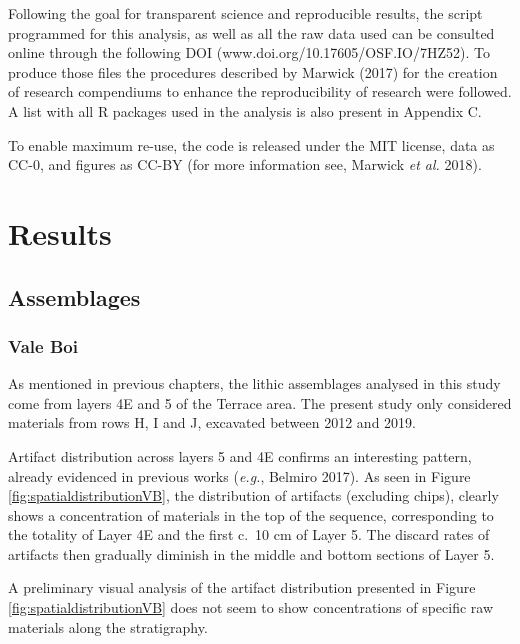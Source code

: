 \documentclass[12pt,twoside]{reedthesis}
\begin{document}
Following the goal for transparent science and reproducible results, the script programmed for this analysis, as well as all the raw data used can be consulted online through the following DOI (www.doi.org/10.17605/OSF.IO/7HZ52). To produce those files the procedures described by Marwick (2017) for the creation of research compendiums to enhance the reproducibility of research were followed. A list with all R packages used in the analysis is also present in Appendix C.

To enable maximum re-use, the code is released under the MIT license, data as CC-0, and figures as CC-BY (for more information see, Marwick \emph{et al.} 2018).

\hypertarget{results}{%
\chapter{Results}\label{results}}

\hypertarget{assemblages}{%
\section{Assemblages}\label{assemblages}}

\hypertarget{vale-boi-2}{%
\subsection{Vale Boi}\label{vale-boi-2}}

As mentioned in previous chapters, the lithic assemblages analysed in this study come from layers 4E and 5 of the Terrace area. The present study only considered materials from rows H, I and J, excavated between 2012 and 2019.

Artifact distribution across layers 5 and 4E confirms an interesting pattern, already evidenced in previous works (\emph{e.g.}, Belmiro 2017). As seen in Figure \ref{fig:spatialdistributionVB}, the distribution of artifacts (excluding chips), clearly shows a concentration of materials in the top of the sequence, corresponding to the totality of Layer 4E and the first c.~10 cm of Layer 5. The discard rates of artifacts then gradually diminish in the middle and bottom sections of Layer 5.

A preliminary visual analysis of the artifact distribution presented in Figure \ref{fig:spatialdistributionVB} does not seem to show concentrations of specific raw materials along the stratigraphy.
\end{document}

